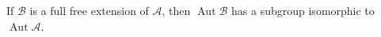 If $\mathcal{B}$ is a full free extension of $\mathcal{A}$, then $\operatorname{Aut} \mathcal{B}$ has a subgroup isomorphic to $\operatorname{Aut} \mathcal{A}$.
